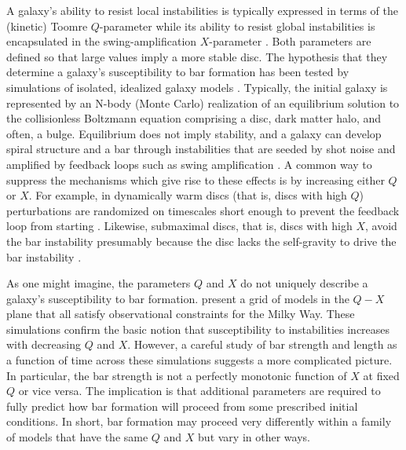 A galaxy's ability to resist local instabilities is typically
expressed in terms of the (kinetic) Toomre $Q$-parameter
\citep{ToomreParameter} while its ability to resist global
instabilities is encapsulated in the swing-amplification $X$-parameter
\citep{GoldreichTremaine1978,GoldreichTremaine1979}.  Both parameters
are defined so that large values imply a more stable disc.  The
hypothesis that they determine a galaxy's susceptibility to bar
formation has been tested by simulations of isolated, idealized galaxy
models \citep{PeeblesOstriker1973, ZangHohlBars1978,
  CombesSandersBars1981,Sellwood1981}.  Typically, the initial galaxy
is represented by an N-body (Monte Carlo) realization of an equilibrium solution to
the collisionless Boltzmann equation comprising a disc, dark matter
halo, and often, a bulge.  Equilibrium does not imply
stability, and a galaxy can develop spiral structure and a bar through
instabilities that are seeded by shot noise
\citep{EfstathiouShotNoise} and amplified by feedback loops such as
swing amplification \citep{Sellwood2013}. A common way to suppress the mechanisms
which give rise to these effects is by increasing either $Q$ or $X$.  For
example, in dynamically warm discs (that is, discs with high $Q$)
perturbations are randomized on timescales short enough to prevent the
feedback loop from starting \citep{AthanassoulaSellwood1986}.
Likewise, submaximal discs, that is, discs with high $X$, avoid the
bar instability presumably because the disc lacks the self-gravity to
drive the bar instability \citep{EfstathiouShotNoise,
  ChristodoulouStability1995, Sellwood2013}.

As one might imagine, the parameters $Q$ and $X$ do not uniquely
describe a galaxy's susceptibility to bar formation.
\citet{WPDGalactICSReference} present a grid of models in the $Q-X$
plane that all satisfy observational constraints for the Milky Way.
These simulations confirm the basic notion that susceptibility to
instabilities increases with decreasing $Q$ and $X$.  However, a
careful study of bar strength and length as a function of time across
these simulations suggests a more complicated picture.  In particular,
the bar strength is not a perfectly monotonic function of $X$ at fixed
$Q$ or vice versa.  The implication is that additional parameters are
required to fully predict how bar formation will proceed from some
prescribed initial conditions.  In short, bar formation may
proceed very differently within a family of models that have the same
$Q$ and $X$ but vary in other ways.

